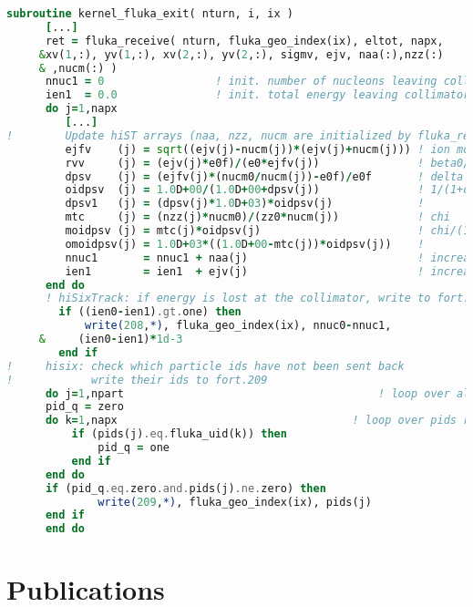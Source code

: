 \begin{appendices}
\begin{minipage}{\linewidth}
\begin{lstlisting}[language=Fortran,caption=Receive particles from FLUKA as implemented in hiSixTrack.,label=lst:coupling_rec]
      subroutine kernel_fluka_exit( nturn, i, ix )
      [...]
      ret = fluka_receive( nturn, fluka_geo_index(ix), eltot, napx,     &
     &xv(1,:), yv(1,:), xv(2,:), yv(2,:), sigmv, ejv, naa(:),nzz(:)     &
     & ,nucm(:) ) 
      nnuc1 = 0                 ! init. number of nucleons leaving collimator
      ien1  = 0.0               ! init. total energy leaving collimator
      do j=1,napx
         [...]
!        Update hiST arrays (naa, nzz, nucm are initialized by fluka_receive)
         ejfv    (j) = sqrt((ejv(j)-nucm(j))*(ejv(j)+nucm(j))) ! ion momentum
         rvv     (j) = (ejv(j)*e0f)/(e0*ejfv(j))               ! beta0/beta
         dpsv    (j) = (ejfv(j)*(nucm0/nucm(j))-e0f)/e0f       ! delta
         oidpsv  (j) = 1.0D+00/(1.0D+00+dpsv(j))               ! 1/(1+delta)
         dpsv1   (j) = (dpsv(j)*1.0D+03)*oidpsv(j)             ! 
         mtc     (j) = (nzz(j)*nucm0)/(zz0*nucm(j))            ! chi
         moidpsv (j) = mtc(j)*oidpsv(j)                        ! chi/(1+delta)
         omoidpsv(j) = 1.0D+03*((1.0D+00-mtc(j))*oidpsv(j))    ! 
         nnuc1       = nnuc1 + naa(j)                          ! increase nucleon counter
         ien1        = ien1  + ejv(j)                          ! increase energy counter
      end do
      ! hiSixTrack: if energy is lost at the collimator, write to fort.208
        if ((ien0-ien1).gt.one) then
            write(208,*), fluka_geo_index(ix), nnuc0-nnuc1,             &
     &     (ien0-ien1)*1d-3
        end if
!     hisix: check which particle ids have not been sent back
!            write their ids to fort.209
      do j=1,npart                                       ! loop over all IDs
	  pid_q = zero
	  do k=1,napx                                    ! loop over pids received
	      if (pids(j).eq.fluka_uid(k)) then
	          pid_q = one
	      end if
	  end do
	  if (pid_q.eq.zero.and.pids(j).ne.zero) then
              write(209,*), fluka_geo_index(ix), pids(j)
	  end if
      end do
\end{lstlisting}
\end{minipage}



\end{appendices}



\chapter*{Publications}


